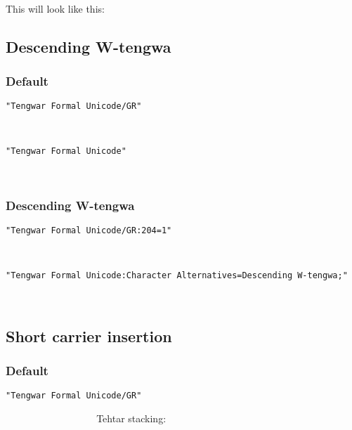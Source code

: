 \documentclass[11pt,a4paper]{article}
\begin{document}
\paragraph{} This will look like this: \myformal   \normalfont


\subsection{Descending W-tengwa}

\subsubsection{Default}

\noindent \texttt{"Tengwar Formal Unicode/GR"}

\formalGR  

\noindent \texttt{"Tengwar Formal Unicode"}

\formalAAT  

\subsubsection{Descending W-tengwa}

\texttt{"Tengwar Formal Unicode/GR:204=1"}

\formalGRdescw  

\noindent \texttt{"Tengwar Formal Unicode:Character Alternatives=Descending W-tengwa;"}

\formalAATdescw  


\subsection{Short carrier insertion}

\subsubsection{Default}

\noindent \texttt{"Tengwar Formal Unicode/GR"}

\newcommand{\combinationsrow}[1]{#1 & #1 & #1 & #1 & #1 & #1 & #1 & #1 & #1 \\}

\formalGR      \normalfont Tehtar stacking:
\formalGR  

\end{document}
